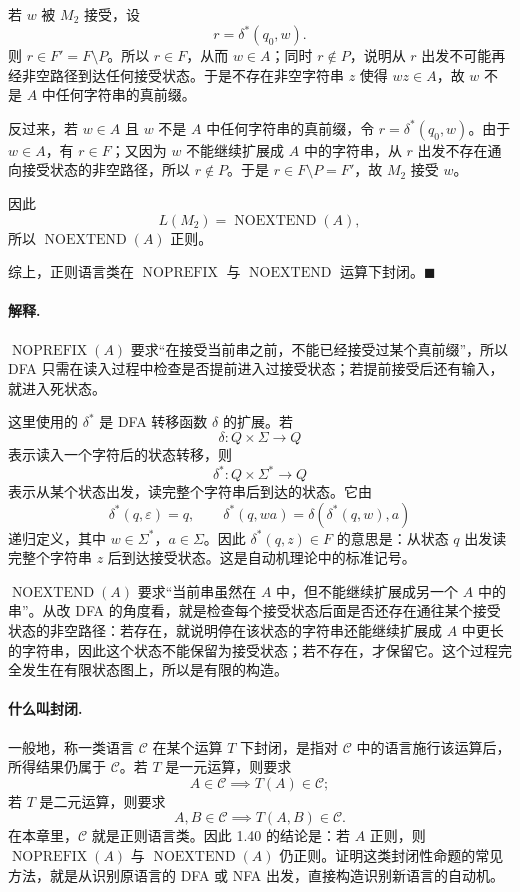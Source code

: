 \begin{answerred}
\begin{enumerate}[label=(\alph*), leftmargin=2.5em]
    若 $w$ 被 $M_2$ 接受，设
    \[
        r=\delta^*(q_0,w).
    \]
    则 $r\in F'=F\setminus P$。所以 $r\in F$，从而 $w\in A$；同时 $r\notin P$，说明从 $r$ 出发不可能再经非空路径到达任何接受状态。于是不存在非空字符串 $z$ 使得 $wz\in A$，故 $w$ 不是 $A$ 中任何字符串的真前缀。

    反过来，若 $w\in A$ 且 $w$ 不是 $A$ 中任何字符串的真前缀，令 $r=\delta^*(q_0,w)$。由于 $w\in A$，有 $r\in F$；又因为 $w$ 不能继续扩展成 $A$ 中的字符串，从 $r$ 出发不存在通向接受状态的非空路径，所以 $r\notin P$。于是 $r\in F\setminus P=F'$，故 $M_2$ 接受 $w$。

    因此
    \[
        L(M_2)=\operatorname{NOEXTEND}(A),
    \]
    所以 $\operatorname{NOEXTEND}(A)$ 正则。
\end{enumerate}

综上，正则语言类在 $\operatorname{NOPREFIX}$ 与 $\operatorname{NOEXTEND}$ 运算下封闭。$\blacksquare$

\begin{answernote}
\paragraph{解释.}
$\operatorname{NOPREFIX}(A)$ 要求“在接受当前串之前，不能已经接受过某个真前缀”，所以 DFA 只需在读入过程中检查是否提前进入过接受状态；若提前接受后还有输入，就进入死状态。

这里使用的 $\delta^*$ 是 DFA 转移函数 $\delta$ 的扩展。若
\[
    \delta:Q\times\Sigma\to Q
\]
表示读入一个字符后的状态转移，则
\[
    \delta^*:Q\times\Sigma^*\to Q
\]
表示从某个状态出发，读完整个字符串后到达的状态。它由
\[
    \delta^*(q,\varepsilon)=q,
    \qquad
    \delta^*(q,wa)=\delta(\delta^*(q,w),a)
\]
递归定义，其中 $w\in\Sigma^*$，$a\in\Sigma$。因此 $\delta^*(q,z)\in F$ 的意思是：从状态 $q$ 出发读完整个字符串 $z$ 后到达接受状态。这是自动机理论中的标准记号。

$\operatorname{NOEXTEND}(A)$ 要求“当前串虽然在 $A$ 中，但不能继续扩展成另一个 $A$ 中的串”。从改 DFA 的角度看，就是检查每个接受状态后面是否还存在通往某个接受状态的非空路径：若存在，就说明停在该状态的字符串还能继续扩展成 $A$ 中更长的字符串，因此这个状态不能保留为接受状态；若不存在，才保留它。这个过程完全发生在有限状态图上，所以是有限的构造。

\paragraph{什么叫封闭.}
一般地，称一类语言 $\mathcal C$ 在某个运算 $T$ 下封闭，是指对 $\mathcal C$ 中的语言施行该运算后，所得结果仍属于 $\mathcal C$。若 $T$ 是一元运算，则要求
\[
    A\in\mathcal C\implies T(A)\in\mathcal C;
\]
若 $T$ 是二元运算，则要求
\[
    A,B\in\mathcal C\implies T(A,B)\in\mathcal C.
\]
在本章里，$\mathcal C$ 就是正则语言类。因此 1.40 的结论是：若 $A$ 正则，则 $\operatorname{NOPREFIX}(A)$ 与 $\operatorname{NOEXTEND}(A)$ 仍正则。证明这类封闭性命题的常见方法，就是从识别原语言的 DFA 或 NFA 出发，直接构造识别新语言的自动机。

\end{answernote}
\end{answerred}
